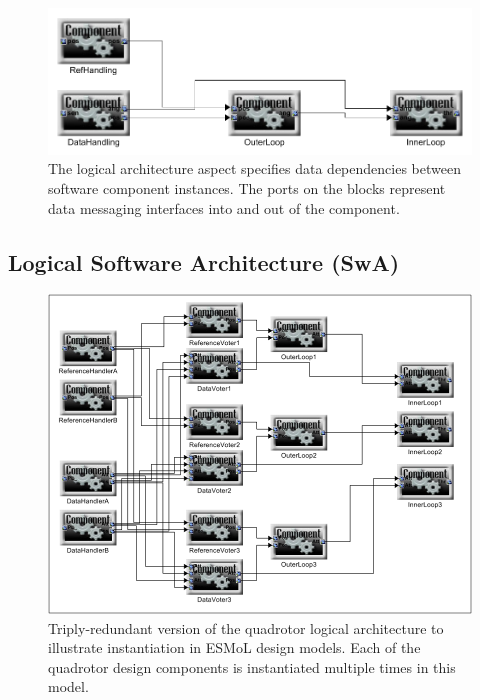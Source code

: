 \begin{figure}
\centering
\includegraphics[width=0.75\columnwidth]{figures/quadrotor_log_arch.png}
    \caption{The logical architecture aspect specifies data
dependencies between software component instances. The ports on the blocks
represent data messaging interfaces into and out of the component.}
    \label{fig:qr_log_arch}
\end{figure}

\subsection{Logical Software Architecture (SwA)}



\begin{figure}
\centering
\includegraphics[width=0.75\columnwidth]{figures/qr_tmr.png}
    \caption{Triply-redundant version of the quadrotor logical architecture to illustrate instantiation in
ESMoL design models.  Each of the quadrotor design components is instantiated multiple times in this model.}
    \label{fig:qr_tmr}
\end{figure}

